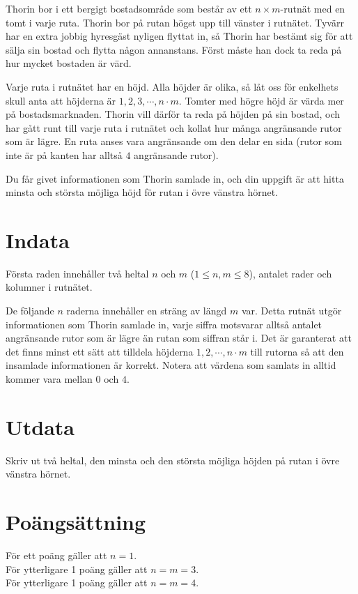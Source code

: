 

\noindent
Thorin bor i ett bergigt bostadsområde som består av ett $n \times m$-rutnät med en tomt i varje ruta.
Thorin bor på rutan högst upp till vänster i rutnätet.
Tyvärr har en extra jobbig hyresgäst nyligen flyttat in, så Thorin har bestämt sig för att sälja sin bostad och flytta någon annanstans.
Först måste han dock ta reda på hur mycket bostaden är värd.

Varje ruta i rutnätet har en höjd. Alla höjder är olika, så låt oss för enkelhets skull anta att höjderna är $1, 2, 3, \cdots, n\cdot m$.
Tomter med högre höjd är värda mer på bostadsmarknaden.
Thorin vill därför ta reda på höjden på sin bostad, och har gått runt till varje ruta i rutnätet och kollat hur många angränsande rutor som är lägre.
En ruta anses vara angränsande om den delar en sida (rutor som inte är på kanten har alltså $4$ angränsande rutor).

Du får givet informationen som Thorin samlade in, och din uppgift är att hitta minsta och största möjliga höjd för rutan i övre vänstra hörnet.

\section*{Indata}
Första raden innehåller två heltal $n$ och $m$ ($1 \leq n,m \leq 8$), antalet rader och kolumner i
rutnätet.

De följande $n$ raderna innehåller en sträng av längd $m$ var. Detta rutnät utgör informationen
som Thorin samlade in, varje siffra motsvarar alltså antalet angränsande rutor som är lägre än rutan som
siffran står i. Det är garanterat att det finns minst ett sätt att tilldela höjderna 
$1, 2, \cdots, n\cdot m$ till rutorna så att den insamlade informationen är korrekt. Notera att värdena
som samlats in alltid kommer vara mellan $0$ och $4$.

\section*{Utdata}
Skriv ut två heltal, den minsta och den största möjliga höjden på rutan i övre vänstra hörnet.

\section*{Poängsättning}
För ett poäng gäller att $n = 1$.\\
För ytterligare 1 poäng gäller att $n = m = 3$.\\
För ytterligare 1 poäng gäller att $n = m = 4$.\\
